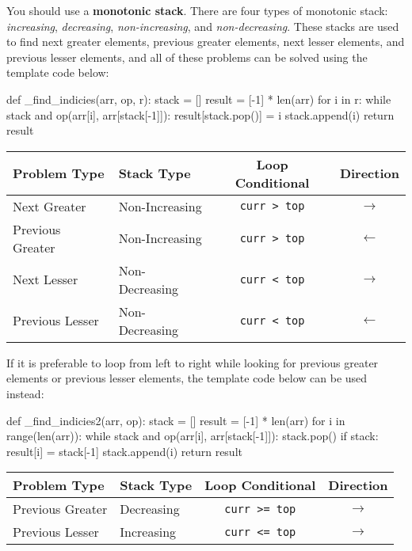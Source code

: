 \documentclass[12pt, titlepage]{article}
\begin{document}
You should use a \textbf{monotonic stack}. There are four types of monotonic stack: \textit{increasing}, \textit{decreasing}, \textit{non-increasing}, and \textit{non-decreasing}. These stacks are used to find next greater elements, previous greater elements, next lesser elements, and previous lesser elements, and all of these problems can be solved using the template code below: \medskip

\begin{python}
def _find_indicies(arr, op, r):
    stack = []
    result = [-1] * len(arr)
    for i in r:
        while stack and op(arr[i], arr[stack[-1]]):
            result[stack.pop()] = i
        stack.append(i)
    return result
\end{python} \medskip

\begin{center}
\begin{tabular}{|l|l|c|c|}
  \hline
  Problem Type & Stack Type & Loop Conditional & Direction \\
  \hline
  Next Greater & Non-Increasing & \texttt{curr > top} & $\rightarrow$ \\
  Previous Greater & Non-Increasing & \texttt{curr > top} & $\leftarrow$ \\
  Next Lesser & Non-Decreasing & \texttt{curr < top} & $\rightarrow$ \\
  Previous Lesser & Non-Decreasing & \texttt{curr < top} & $\leftarrow$ \\
  \hline
\end{tabular}
\end{center} \bigskip

If it is preferable to loop from left to right while looking for previous greater elements or previous lesser elements, the template code below can be used instead: \medskip

\begin{python}
def _find_indicies2(arr, op):
    stack = []
    result = [-1] * len(arr)
    for i in range(len(arr)):
        while stack and op(arr[i], arr[stack[-1]]):
            stack.pop()
        if stack:
            result[i] = stack[-1]
        stack.append(i)
    return result
\end{python} \medskip

\begin{center}
\begin{tabular}{|l|l|c|c|}
  \hline
  Problem Type & Stack Type & Loop Conditional & Direction \\
  \hline
  Previous Greater & Decreasing & \texttt{curr >= top} & $\rightarrow$ \\
  Previous Lesser & Increasing & \texttt{curr <= top} & $\rightarrow$ \\
  \hline
\end{tabular}
\end{center} \bigskip
\end{document}
